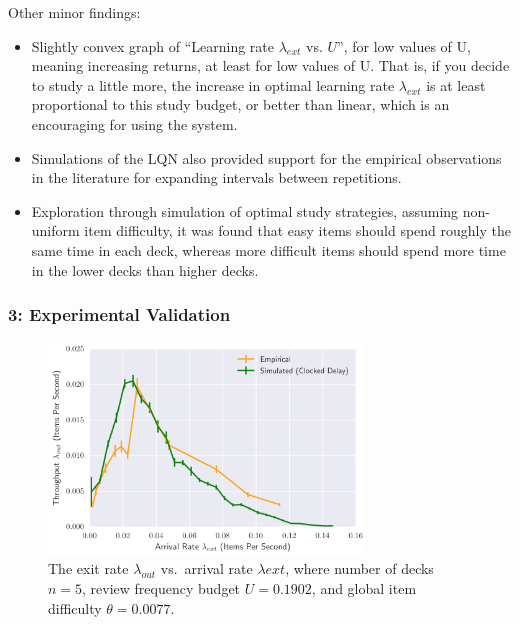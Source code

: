 Other minor findings:

\begin{itemize}
\tightlist
\item
  Slightly convex graph of ``Learning rate \(\lambda_{ext}\) vs.
  \(U\)'', for low values of U, meaning increasing returns, at least for
  low values of U. That is, if you decide to study a little more, the
  increase in optimal learning rate \(\lambda_{ext}\) is at least
  proportional to this study budget, or better than linear, which is an
  encouraging for using the system.
\item
  Simulations of the LQN also provided support for the empirical
  observations in the literature for expanding intervals between
  repetitions.
\item
  Exploration through simulation of optimal study strategies, assuming
  non-uniform item difficulty, it was found that easy items should spend
  roughly the same time in each deck, whereas more difficult items
  should spend more time in the lower decks than higher decks.
\end{itemize}

\subsubsection{3: Experimental
Validation}\label{experimental-validation}

\begin{figure}
\centering
\includegraphics[width=0.75000\textwidth]{assets/verification1.png}
\caption[The exit rate \(\lambda_{out}\) vs.~arrival rate
\(\lambda{ext}\), where number of decks \(n = 5\), review frequency
budget \(U = 0.1902\), and global item difficulty
\(\theta = 0.0077\).]{The exit rate \(\lambda_{out}\) vs.~arrival rate
\(\lambda{ext}\), where number of decks \(n = 5\), review frequency
budget \(U = 0.1902\), and global item difficulty
\(\theta = 0.0077\).\footnotemark{}}\label{fig:verification1fig14}
\end{figure}

